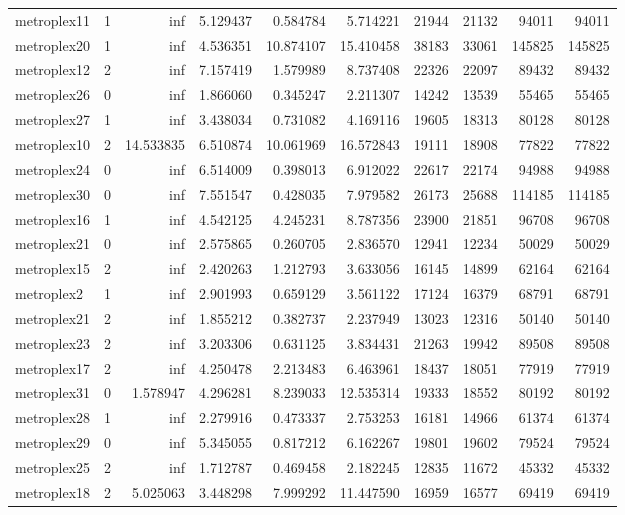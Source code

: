 \begin{longtable}{|l|r|r|r|r|r|r|r|r|r|}
metroplex11 & 1 & inf & 5.129437 & 0.584784 & 5.714221 & 21944 & 21132 & 94011 & 94011 \\
metroplex20 & 1 & inf & 4.536351 & 10.874107 & 15.410458 & 38183 & 33061 & 145825 & 145825 \\
metroplex12 & 2 & inf & 7.157419 & 1.579989 & 8.737408 & 22326 & 22097 & 89432 & 89432 \\
metroplex26 & 0 & inf & 1.866060 & 0.345247 & 2.211307 & 14242 & 13539 & 55465 & 55465 \\
metroplex27 & 1 & inf & 3.438034 & 0.731082 & 4.169116 & 19605 & 18313 & 80128 & 80128 \\
metroplex10 & 2 & 14.533835 & 6.510874 & 10.061969 & 16.572843 & 19111 & 18908 & 77822 & 77822 \\
metroplex24 & 0 & inf & 6.514009 & 0.398013 & 6.912022 & 22617 & 22174 & 94988 & 94988 \\
metroplex30 & 0 & inf & 7.551547 & 0.428035 & 7.979582 & 26173 & 25688 & 114185 & 114185 \\
metroplex16 & 1 & inf & 4.542125 & 4.245231 & 8.787356 & 23900 & 21851 & 96708 & 96708 \\
metroplex21 & 0 & inf & 2.575865 & 0.260705 & 2.836570 & 12941 & 12234 & 50029 & 50029 \\
metroplex15 & 2 & inf & 2.420263 & 1.212793 & 3.633056 & 16145 & 14899 & 62164 & 62164 \\
metroplex2 & 1 & inf & 2.901993 & 0.659129 & 3.561122 & 17124 & 16379 & 68791 & 68791 \\
metroplex21 & 2 & inf & 1.855212 & 0.382737 & 2.237949 & 13023 & 12316 & 50140 & 50140 \\
metroplex23 & 2 & inf & 3.203306 & 0.631125 & 3.834431 & 21263 & 19942 & 89508 & 89508 \\
metroplex17 & 2 & inf & 4.250478 & 2.213483 & 6.463961 & 18437 & 18051 & 77919 & 77919 \\
metroplex31 & 0 & 1.578947 & 4.296281 & 8.239033 & 12.535314 & 19333 & 18552 & 80192 & 80192 \\
metroplex28 & 1 & inf & 2.279916 & 0.473337 & 2.753253 & 16181 & 14966 & 61374 & 61374 \\
metroplex29 & 0 & inf & 5.345055 & 0.817212 & 6.162267 & 19801 & 19602 & 79524 & 79524 \\
metroplex25 & 2 & inf & 1.712787 & 0.469458 & 2.182245 & 12835 & 11672 & 45332 & 45332 \\
metroplex18 & 2 & 5.025063 & 3.448298 & 7.999292 & 11.447590 & 16959 & 16577 & 69419 & 69419 \\

\end{longtable}

